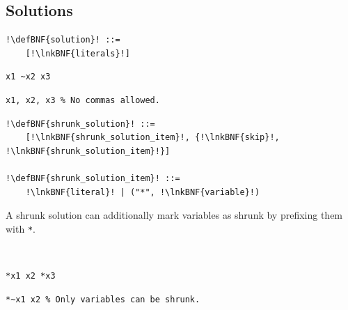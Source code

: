 \documentclass[a4paper]{article}
\newcommand{\defBNF}[1]{\hypertarget{def:#1}{<\detokenize{#1}>}}
\newcommand{\lnkBNF}[1]{\hyperlink{def:#1}{<\detokenize{#1}>}}
\begin{document}
\subsection{Solutions}\label{sec:solutions}
\begin{lstlisting}
!\defBNF{solution}! ::=
	[!\lnkBNF{literals}!]
\end{lstlisting}
\begin{minipage}{.49\linewidth}
	\begin{lstlisting}[language=veripb, gobble=4, rulecolor=\color{veripb-valid-text}, caption={Syntactically correct solution.}]
	x1 ~x2 x3
	\end{lstlisting}
\end{minipage}\hfill%
\begin{minipage}{.49\linewidth}
	\begin{lstlisting}[language=veripb, gobble=4, rulecolor=\color{veripb-invalid-text}, caption={Syntactically incorrect solution.}]
	x1, x2, x3 % No commas allowed.
	\end{lstlisting}
\end{minipage}

\begin{lstlisting}
!\defBNF{shrunk_solution}! ::=
	[!\lnkBNF{shrunk_solution_item}!, {!\lnkBNF{skip}!, !\lnkBNF{shrunk_solution_item}!}]

!\defBNF{shrunk_solution_item}! ::=
	!\lnkBNF{literal}! | ("*", !\lnkBNF{variable}!)
\end{lstlisting}
A shrunk solution can additionally mark variables as shrunk by prefixing them with \texttt{*}.

~\\
\begin{minipage}{.49\linewidth}
	\begin{lstlisting}[language=veripb, gobble=4, rulecolor=\color{veripb-valid-text}, caption={Syntactically correct shrunk solution.}]
	*x1 x2 *x3
	\end{lstlisting}
\end{minipage}\hfill%
\begin{minipage}{.49\linewidth}
	\begin{lstlisting}[language=veripb, gobble=4, rulecolor=\color{veripb-invalid-text}, caption={Syntactically incorrect shrunk solution.}]
	*~x1 x2 % Only variables can be shrunk.
	\end{lstlisting}
\end{minipage}
\end{document}
